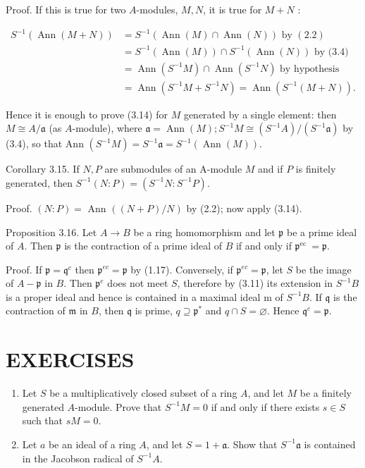 \documentclass{standalone}
\theoremstyle{definition}
\theoremstyle{remark}
\begin{document}
Proof. If this is true for two $A$-modules, $M, N$, it is true for $M+N$ :

\[
\begin{aligned}
S^{-1}(\operatorname{Ann}(M+N)) & =S^{-1}(\operatorname{Ann}(M) \cap \operatorname{Ann}(N)) \text { by }(2.2) \\
& =S^{-1}(\operatorname{Ann}(M)) \cap S^{-1}(\operatorname{Ann}(N)) \text { by (3.4) } \\
& =\operatorname{Ann}\left(S^{-1} M\right) \cap \operatorname{Ann}\left(S^{-1} N\right) \text { by hypothesis } \\
& =\operatorname{Ann}\left(S^{-1} M+S^{-1} N\right)=\operatorname{Ann}\left(S^{-1}(M+N)\right) .
\end{aligned}
\]

Hence it is enough to prove (3.14) for $M$ generated by a single element: then $M \cong A / \mathfrak{a}$ (as $A$-module), where $\mathfrak{a}=\operatorname{Ann}(M) ; S^{-1} M \cong\left(S^{-1} A\right) /\left(S^{-1} \mathfrak{a}\right)$ by (3.4), so that Ann $\left(S^{-1} M\right)=S^{-1} \mathfrak{a}=S^{-1}(\operatorname{Ann}(M))$.

Corollary 3.15. If $N, P$ are submodules of an A-module $M$ and if $P$ is finitely generated, then $S^{-1}(N: P)=\left(S^{-1} N: S^{-1} P\right)$.

Proof. $(N: P)=$ Ann $((N+P) / N)$ by (2.2); now apply (3.14).

Proposition 3.16. Let $A \rightarrow B$ be a ring homomorphism and let $\mathfrak{p}$ be a prime ideal of $A$. Then $\mathfrak{p}$ is the contraction of a prime ideal of $B$ if and only if $\mathfrak{p}^{\text {ec }}=\mathfrak{p}$.

Proof. If $\mathfrak{p}=\mathfrak{q}^{c}$ then $\mathfrak{p}^{e c}=\mathfrak{p}$ by (1.17). Conversely, if $\mathfrak{p}^{e c}=\mathfrak{p}$, let $S$ be the image of $A-\mathfrak{p}$ in $B$. Then $\mathfrak{p}^{e}$ does not meet $S$, therefore by (3.11) its extension in $S^{-1} B$ is a proper ideal and hence is contained in a maximal ideal $\mathrm{m}$ of $S^{-1} B$. If $\mathfrak{q}$ is the contraction of $\mathfrak{m}$ in $B$, then $\mathfrak{q}$ is prime, $q \supseteq \mathfrak{p}^{*}$ and $q \cap S=\varnothing$. Hence $\mathfrak{q}^{c}=\mathfrak{p}$.

\section{EXERCISES}
\begin{enumerate}
  \item Let $S$ be a multiplicatively closed subset of a ring $A$, and let $M$ be a finitely generated $A$-module. Prove that $S^{-1} M=0$ if and only if there exists $s \in S$ such that $s M=0$.

  \item Let $a$ be an ideal of a ring $A$, and let $S=1+\mathfrak{a}$. Show that $S^{-1} \mathfrak{a}$ is contained in the Jacobson radical of $S^{-1} A$.

\end{enumerate}
\end{document}
